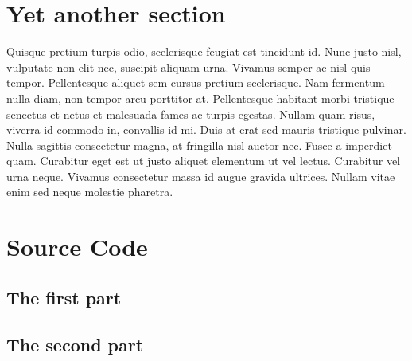 \documentclass[12pt]{article} %
\begin{document}
\section{Yet another section}

Quisque pretium turpis odio, scelerisque feugiat est tincidunt id. Nunc justo nisl, vulputate non elit nec, suscipit aliquam urna. Vivamus semper ac nisl quis tempor. Pellentesque aliquet sem cursus pretium scelerisque. Nam fermentum nulla diam, non tempor arcu porttitor at. Pellentesque habitant morbi tristique senectus et netus et malesuada fames ac turpis egestas. Nullam quam risus, viverra id commodo in, convallis id mi. Duis at erat sed mauris tristique pulvinar. Nulla sagittis consectetur magna, at fringilla nisl auctor nec. Fusce a imperdiet quam. Curabitur eget est ut justo aliquet elementum ut vel lectus. Curabitur vel urna neque. Vivamus consectetur massa id augue gravida ultrices. Nullam vitae enim sed neque molestie pharetra. 

\pagebreak
\appendix

\section{Source Code}
\subsection{The first part}


\subsection{The second part}

\end{document}

